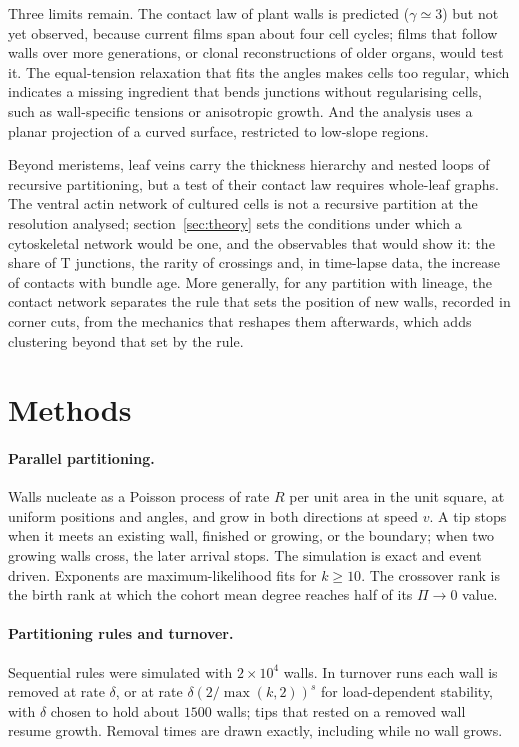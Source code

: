 \documentclass[11pt,a4paper]{article}
\begin{document}
Three limits remain. The contact law of plant walls is predicted ($\gamma\simeq3$) but not yet
observed, because current films span about four cell cycles; films that follow walls over more
generations, or clonal reconstructions of older organs, would test it. The equal-tension
relaxation that fits the angles makes cells too regular, which indicates a missing ingredient
that bends junctions without regularising cells, such as wall-specific tensions or anisotropic
growth. And the analysis uses a planar projection of a curved surface, restricted to low-slope
regions.

Beyond meristems, leaf veins carry the thickness hierarchy and nested loops of recursive
partitioning, but a test of their contact law requires whole-leaf graphs. The ventral actin
network of cultured cells is not a recursive partition at the resolution analysed;
section~\ref{sec:theory} sets the conditions under which a cytoskeletal network would be one,
and the observables that would show it: the share of T junctions, the rarity of crossings and,
in time-lapse data, the increase of contacts with bundle age. More generally, for any partition
with lineage, the contact network separates the rule that sets the position of new walls, recorded
in corner cuts, from the mechanics that reshapes them afterwards, which adds clustering beyond that set by
the rule.

\section{Methods}
\label{sec:methods}

\paragraph{Parallel partitioning.} Walls nucleate as a Poisson process of rate $R$ per unit
area in the unit square, at uniform positions and angles, and grow in both directions at
speed $v$. A tip stops when it meets an existing wall, finished or growing, or the
boundary; when two growing walls cross, the later arrival stops. The simulation is exact
and event driven. Exponents are maximum-likelihood fits for $k\geq10$. The crossover rank
is the birth rank at which the cohort mean degree reaches half of its $\Pi\to0$ value.

\paragraph{Partitioning rules and turnover.} Sequential rules were simulated with $2\times10^4$
walls. In turnover runs each wall is removed at rate $\delta$, or at rate
$\delta(2/\max(k,2))^s$ for load-dependent stability, with $\delta$ chosen to hold about
$1500$ walls; tips that rested on a removed wall resume growth. Removal times are drawn
exactly, including while no wall grows.
\end{document}

